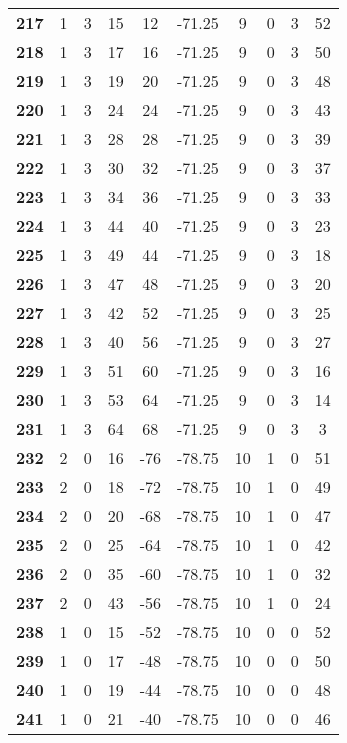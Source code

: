 \documentclass[12pt,letterpaper, onecolumn]{exam}
\begin{document}
\begin{longtable}{cccccccccc}
    \textbf{217} & 1 & 3 & 15 & 12 & -71.25 & 9 & 0 & 3 & 52 \\ 
    \textbf{218} & 1 & 3 & 17 & 16 & -71.25 & 9 & 0 & 3 & 50 \\ 
    \textbf{219} & 1 & 3 & 19 & 20 & -71.25 & 9 & 0 & 3 & 48 \\ 
    \textbf{220} & 1 & 3 & 24 & 24 & -71.25 & 9 & 0 & 3 & 43 \\ 
    \textbf{221} & 1 & 3 & 28 & 28 & -71.25 & 9 & 0 & 3 & 39 \\ 
    \textbf{222} & 1 & 3 & 30 & 32 & -71.25 & 9 & 0 & 3 & 37 \\ 
    \textbf{223} & 1 & 3 & 34 & 36 & -71.25 & 9 & 0 & 3 & 33 \\ 
    \textbf{224} & 1 & 3 & 44 & 40 & -71.25 & 9 & 0 & 3 & 23 \\ 
    \textbf{225} & 1 & 3 & 49 & 44 & -71.25 & 9 & 0 & 3 & 18 \\ 
    \textbf{226} & 1 & 3 & 47 & 48 & -71.25 & 9 & 0 & 3 & 20 \\ 
    \textbf{227} & 1 & 3 & 42 & 52 & -71.25 & 9 & 0 & 3 & 25 \\ 
    \textbf{228} & 1 & 3 & 40 & 56 & -71.25 & 9 & 0 & 3 & 27 \\ 
    \textbf{229} & 1 & 3 & 51 & 60 & -71.25 & 9 & 0 & 3 & 16 \\ 
    \textbf{230} & 1 & 3 & 53 & 64 & -71.25 & 9 & 0 & 3 & 14 \\ 
    \textbf{231} & 1 & 3 & 64 & 68 & -71.25 & 9 & 0 & 3 & 3 \\ 
    \textbf{232} & 2 & 0 & 16 & -76 & -78.75 & 10 & 1 & 0 & 51 \\ 
    \textbf{233} & 2 & 0 & 18 & -72 & -78.75 & 10 & 1 & 0 & 49 \\ 
    \textbf{234} & 2 & 0 & 20 & -68 & -78.75 & 10 & 1 & 0 & 47 \\ 
    \textbf{235} & 2 & 0 & 25 & -64 & -78.75 & 10 & 1 & 0 & 42 \\ 
    \textbf{236} & 2 & 0 & 35 & -60 & -78.75 & 10 & 1 & 0 & 32 \\ 
    \textbf{237} & 2 & 0 & 43 & -56 & -78.75 & 10 & 1 & 0 & 24 \\     \hline
    \textbf{238} & 1 & 0 & 15 & -52 & -78.75 & 10 & 0 & 0 & 52 \\ 
    \textbf{239} & 1 & 0 & 17 & -48 & -78.75 & 10 & 0 & 0 & 50 \\ 
    \textbf{240} & 1 & 0 & 19 & -44 & -78.75 & 10 & 0 & 0 & 48 \\ 
    \textbf{241} & 1 & 0 & 21 & -40 & -78.75 & 10 & 0 & 0 & 46 \\ 

\end{longtable}
\end{document}

